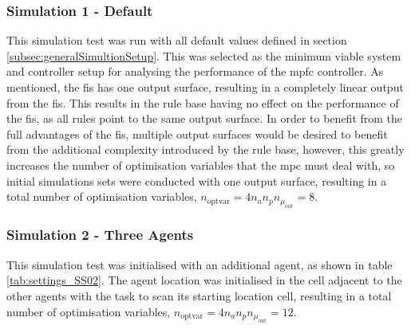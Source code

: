\documentclass[conference]{IEEEtran}
\begin{document}
\subsubsection{Simulation 1 - Default}  \label{subsubsec:SS01}

This simulation test was run with all default values defined in section \ref{subsec:generalSimultionSetup}.
This was selected as the minimum viable system and controller setup for analysing the performance of the \gls{mpfc} controller.
As mentioned, the \gls{fis} has one output surface, resulting in a completely linear output from the \gls{fis}.
This results in the rule base having no effect on the performance of the \gls{fis}, as all rules point to the same output surface.
In order to benefit from the full advantages of the \gls{fis}, multiple output surfaces would be desired to benefit from the additional complexity introduced by the rule base, however, this greatly increases the number of optimisation variables that the \gls{mpc} must deal with, so initial simulations sets were conducted with one output surface, resulting in a total number of optimisation variables, $n_{\text{optvar}} = 4 n_{a} n_{p} n_{\mu_{\text{out}}} = 8$.

\subsubsection{Simulation 2 - Three Agents} \label{subsubsec:SS02}

This simulation test was initialised with an additional agent, as shown in table \ref{tab:settings_SS02}.
The agent location was initialised in the cell adjacent to the other agents with the task to scan its starting location cell, resulting in a total number of optimisation variables, $n_{\text{optvar}} = 4 n_{a} n_{p} n_{\mu_{\text{out}}} = 12$.
\end{document}
